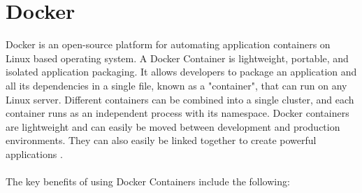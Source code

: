 \documentclass[BIF,Master,nenglish]{twbook}%
\begin{document}
\section{Docker}
Docker is an open-source platform for automating application containers on Linux based operating system. A Docker Container is lightweight, portable, and isolated application packaging. It allows developers to package an application and all its dependencies in a single file, known as a "container", that can run on any Linux server. Different containers can be combined into a single cluster, and each container runs as an independent process with its namespace. Docker containers are lightweight and can easily be moved between development and production environments. They can also easily be linked together to create powerful applications \cite{rad2017}.
\\
\\
The key benefits of using Docker Containers include the following: 
\end{document}
